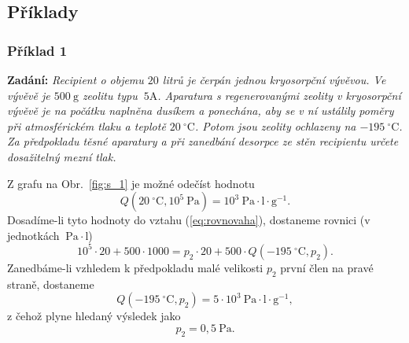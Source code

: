 \documentclass[english]{article}
\newcommand{\unit}[1]{~\mathrm{#1}}
\begin{document}
\subsection{Příklady}
\subsubsection{Příklad 1}
\textbf{Zadání:} \emph{Recipient o objemu $20$ litrů je čerpán jednou kryosorpční vývěvou. Ve vývěvě je $500\unit{g}$ zeolitu typu $\unit{5A}$. Aparatura s regenerovanými zeolity v kryosorpční vývěvě je na počátku naplněna dusíkem a ponechána, aby se v ní ustálily poměry při atmosférickém tlaku a teplotě $20\unit{^\circ C}$. Potom jsou zeolity ochlazeny na $-195\unit{^\circ C}$. Za předpokladu těsné aparatury a při zanedbání desorpce ze stěn recipientu určete dosažitelný mezní tlak.}

\vspace{0.5cm}
Z grafu na Obr.~\ref{fig:s_1} je možné odečíst hodnotu 
\begin{equation}
	Q(20\unit{^\circ C}, 10^{5}\unit{Pa}) = 10^{3}\unit{Pa\cdot l\cdot g^{-1}}.
\end{equation} 
Dosadíme-li tyto hodnoty do vztahu (\ref{eq:rovnovaha}), dostaneme rovnici (v jednotkách $\unit{Pa\cdot l}$)
\begin{equation}
10^{5}\cdot 20 + 500\cdot 1000 = p_2\cdot 20 + 500\cdot Q(-195\unit{^\circ C}, p_2).
\label{eq:pr1}
\end{equation}
Zanedbáme-li vzhledem k předpokladu malé velikosti $p_2$ první člen na pravé straně, dostaneme
\begin{equation}
	Q(-195\unit{^\circ C}, p_2) = 5\cdot 10^3\unit{Pa\cdot l\cdot g^{-1}},
\end{equation}
z čehož plyne hledaný výsledek jako 
\begin{equation}
	 p_2 = 0,5\unit{Pa}.
\end{equation}
\end{document}
